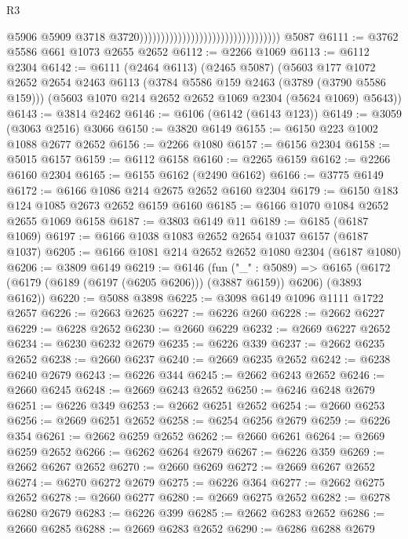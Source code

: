 \begin{lexlean}{R3}
\begin{coremodule}
                                                                      @5906
                                                                      @5909
                                                                      @3718
                                                                      @3720)))))))))))))))))))))))))))))))))
    @5087
@6111 := @3762 @5586 @661 @1073 @2655 @2652
@6112 := @2266 @1069
@6113 := @6112 @2304
@6142 := @6111
    (@2464 @6113)
    (@2465 @5087)
    (@5603
      @177
      @1072
      @2652
      @2654
      @2463
      @6113
      (@3784 @5586 @159 @2463 (@3789 (@3790 @5586 @159)))
      (@5603 @1070 @214 @2652 @2652 @1069 @2304 (@5624 @1069) @5643))
@6143 := @3814 @2462
@6146 := @6106 (@6142 (@6143 @123))
@6149 := @3059 (@3063 @2516) @3066
@6150 := @3820 @6149
@6155 := @6150 @223 @1002 @1088 @2677 @2652
@6156 := @2266 @1080
@6157 := @6156 @2304
@6158 := @5015 @6157
@6159 := @6112 @6158
@6160 := @2265 @6159
@6162 := @2266 @6160 @2304
@6165 := @6155 @6162 (@2490 @6162)
@6166 := @3775 @6149
@6172 := @6166 @1086 @214 @2675 @2652 @6160 @2304
@6179 := @6150 @183 @124 @1085 @2673 @2652 @6159 @6160
@6185 := @6166 @1070 @1084 @2652 @2655 @1069 @6158
@6187 := @3803 @6149 @11
@6189 := @6185 (@6187 @1069)
@6197 := @6166 @1038 @1083 @2652 @2654 @1037 @6157 (@6187 @1037)
@6205 := @6166 @1081 @214 @2652 @2652 @1080 @2304 (@6187 @1080)
@6206 := @3809 @6149
@6219 := @6146
    (fun ("_" : @5089) =>
    @6165 (@6172 (@6179 (@6189 (@6197 (@6205 @6206))) (@3887 @6159)) @6206) (@3893 @6162))
@6220 := @5088 @3898
@6225 := @3098 @6149 @1096 @1111 @1722 @2657
@6226 := @2663 @2625
@6227 := @6226 @260
@6228 := @2662 @6227
@6229 := @6228 @2652
@6230 := @2660 @6229
@6232 := @2669 @6227 @2652
@6234 := @6230 @6232 @2679
@6235 := @6226 @339
@6237 := @2662 @6235 @2652
@6238 := @2660 @6237
@6240 := @2669 @6235 @2652
@6242 := @6238 @6240 @2679
@6243 := @6226 @344
@6245 := @2662 @6243 @2652
@6246 := @2660 @6245
@6248 := @2669 @6243 @2652
@6250 := @6246 @6248 @2679
@6251 := @6226 @349
@6253 := @2662 @6251 @2652
@6254 := @2660 @6253
@6256 := @2669 @6251 @2652
@6258 := @6254 @6256 @2679
@6259 := @6226 @354
@6261 := @2662 @6259 @2652
@6262 := @2660 @6261
@6264 := @2669 @6259 @2652
@6266 := @6262 @6264 @2679
@6267 := @6226 @359
@6269 := @2662 @6267 @2652
@6270 := @2660 @6269
@6272 := @2669 @6267 @2652
@6274 := @6270 @6272 @2679
@6275 := @6226 @364
@6277 := @2662 @6275 @2652
@6278 := @2660 @6277
@6280 := @2669 @6275 @2652
@6282 := @6278 @6280 @2679
@6283 := @6226 @399
@6285 := @2662 @6283 @2652
@6286 := @2660 @6285
@6288 := @2669 @6283 @2652
@6290 := @6286 @6288 @2679

\end{coremodule}
\end{lexlean}
